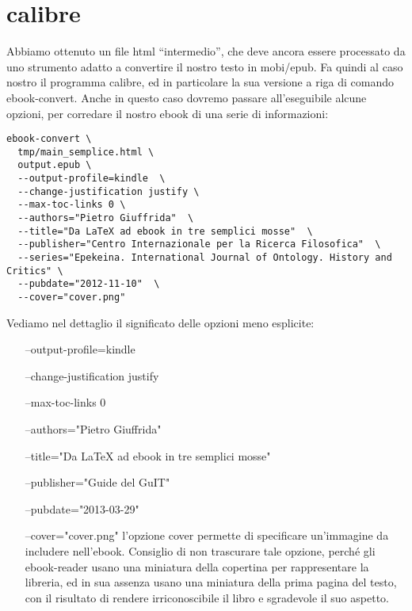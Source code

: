 

\chapter{calibre}

Abbiamo ottenuto un file html ``intermedio'', che deve ancora
essere processato da uno strumento adatto a convertire il nostro testo in 
mobi/epub. Fa quindi al caso nostro il programma calibre, ed in particolare la 
sua versione a riga di comando ebook-convert. Anche in questo caso dovremo 
passare all'eseguibile alcune opzioni, per corredare il nostro ebook di una 
serie di informazioni:

\begin{lstlisting}
ebook-convert \
  tmp/main_semplice.html \
  output.epub \
  --output-profile=kindle  \
  --change-justification justify \
  --max-toc-links 0 \
  --authors="Pietro Giuffrida"  \
  --title="Da LaTeX ad ebook in tre semplici mosse"  \
  --publisher="Centro Internazionale per la Ricerca Filosofica"  \
  --series="Epekeina. International Journal of Ontology. History and Critics" \
  --pubdate="2012-11-10"  \
  --cover="cover.png"

\end{lstlisting}

Vediamo nel dettaglio il significato delle opzioni meno esplicite: 
\begin{itemize}
\item[--output-profile=kindle]
\item[--change-justification justify]
\item[--max-toc-links 0]
\item[--authors="Pietro Giuffrida"]
\item[--title="Da LaTeX ad ebook in tre semplici mosse"]
\item[--publisher="Guide del GuIT"]
\item[--pubdate="2013-03-29"]
\item[--cover="cover.png"]
l'opzione cover permette di specificare un'immagine da
includere nell'ebook. Consiglio di non trascurare tale opzione, perché gli 
ebook-reader usano una miniatura della copertina per rappresentare la libreria, 
ed in sua assenza usano una miniatura della prima pagina del testo, con il 
risultato di rendere irriconoscibile il libro e sgradevole il suo aspetto. 
\end{itemize}

